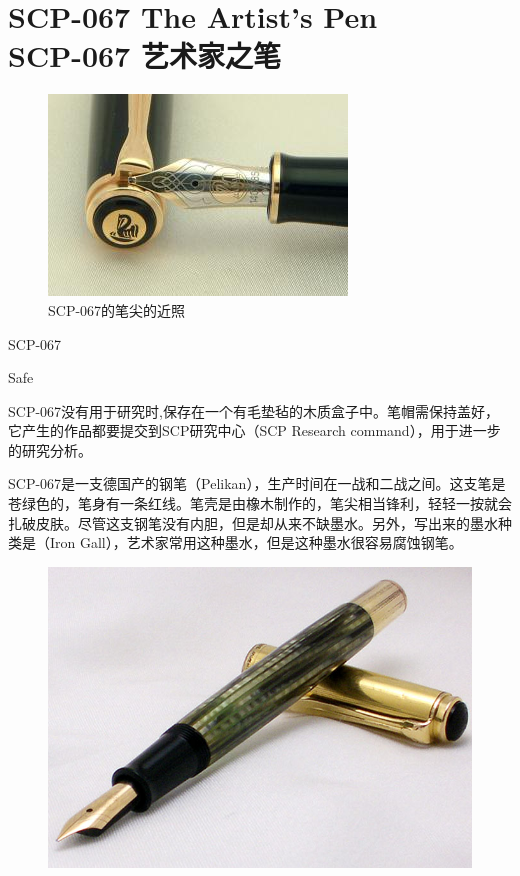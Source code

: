 \chapter[SCP-067 艺术家之笔]{
    SCP-067 The Artist's Pen\\
    SCP-067 艺术家之笔
}

\label{chap:SCP-067}

\begin{figure}[H]
    \centering
    \includegraphics[width=0.5\linewidth]{images/SCP-067.jpg}
    \caption*{SCP-067的笔尖的近照}
\end{figure}

SCP-067

Safe

 SCP-067没有用于研究时,保存在一个有毛垫毡的木质盒子中。笔帽需保持盖好，它产生的作品都要提交到SCP研究中心（SCP Research command），用于进一步的研究分析。

SCP-067是一支德国产的钢笔（Pelikan），生产时间在一战和二战之间。这支笔是苍绿色的，笔身有一条红线。笔壳是由橡木制作的，笔尖相当锋利，轻轻一按就会扎破皮肤。尽管这支钢笔没有内胆，但是却从来不缺墨水。另外，写出来的墨水种类是（Iron Gall），艺术家常用这种墨水，但是这种墨水很容易腐蚀钢笔。

\begin{figure}[H]
    \centering
    \includegraphics[width=0.5\linewidth]{images/SCP-067-2.jpg}
    \caption*{}
\end{figure}

